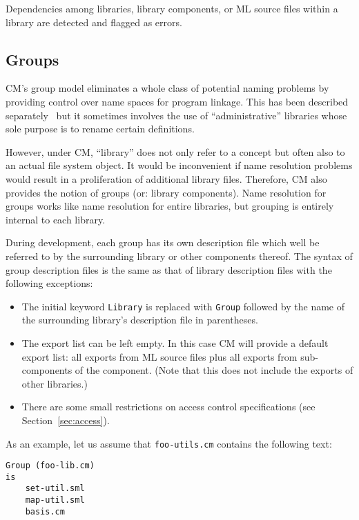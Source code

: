 \documentclass{article}
\begin{document}
Dependencies among libraries, library components, or ML source files
within a library are detected and flagged as errors.

\subsection{Groups}
\label{sec:groups}

CM's group model eliminates a whole class of potential naming problems
by providing control over name spaces for program linkage.  This has
been described separately~\cite{blume:appel:cm99} but it sometimes
involves the use of ``administrative'' libraries whose sole purpose is
to rename certain definitions.

However, under CM, ``library'' does not only refer to a concept but
often also to an actual file system object.  It would be inconvenient
if name resolution problems would result in a proliferation of
additional library files.  Therefore, CM also provides the notion of
groups (or: library components).  Name resolution for groups works
like name resolution for entire libraries, but grouping is entirely
internal to each library.

During development, each group has its own description file which well
be referred to by the surrounding library or other components thereof.
The syntax of group description files is the same as that of library
description files with the following exceptions:

\begin{itemize}
\item The initial keyword {\tt Library} is replaced with {\tt Group}
followed by the name of the surrounding library's description file in
parentheses.
\item The export list can be left empty.  In this case CM will
provide a default export list: all exports from ML source files plus
all exports from sub-components of the component.  (Note that this does
not include the exports of other libraries.)
\item There are some small restrictions on access control
specifications (see Section~\ref{sec:access}).
\end{itemize}

As an example, let us assume that {\tt foo-utils.cm} contains the
following text:

\begin{verbatim}
Group (foo-lib.cm)
is
    set-util.sml
    map-util.sml
    basis.cm
\end{verbatim}
\end{document}
